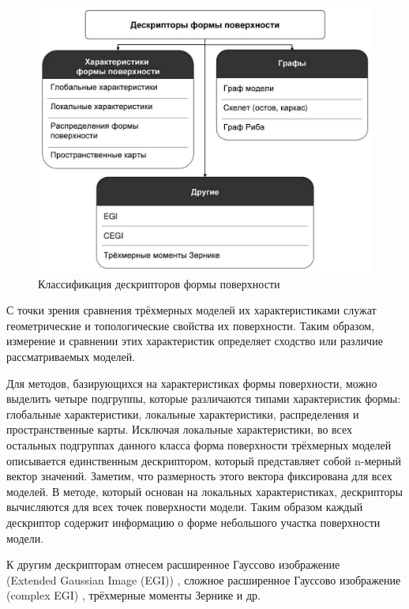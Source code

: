 \documentclass[14pt]{article}
\numberwithin{figure}{section}
\numberwithin{equation}{section}
\begin{document}
\begin{figure}[h]
	\begin{center}
		\includegraphics[scale=0.46]{1.JPG}
		\caption{Классификация дескрипторов формы поверхности}
		\label{ris:1}
	\end{center}
\end{figure}

С точки зрения сравнения трёхмерных моделей их характеристиками служат геометрические и топологические свойства их поверхности. Таким образом, измерение и сравнении этих характеристик определяет сходство или различие рассматриваемых моделей.

Для методов, базирующихся на характеристиках формы поверхности, можно выделить четыре подгруппы, которые различаются типами характеристик формы: глобальные характеристики, локальные характеристики, распределения и пространственные карты. Исключая локальные характеристики, во всех остальных подгруппах данного класса форма поверхности трёхмерных моделей описывается единственным дескриптором, который представляет собой n-мерный вектор значений. Заметим, что размерность этого вектора фиксирована для всех моделей. В методе, который основан на локальных характеристиках, дескрипторы вычисляются для всех точек поверхности модели. Таким образом каждый дескриптор содержит информацию о форме небольшого участка поверхности модели.

К другим дескрипторам отнесем расширенное Гауссово изображение \\(Extended Gaussian Image (EGI)) \cite{Horn}, сложное расширенное Гауссово изображение (complex EGI) \cite{Kang}, трёхмерные моменты Зернике \cite{Novotni} и др.
\end{document}
